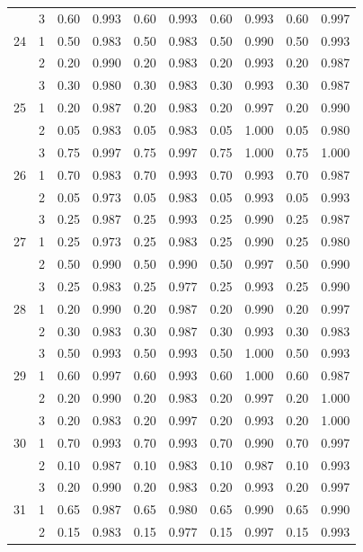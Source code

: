 \begin{longtable}{llcccccccc}
   & 3 & 0.60 & 0.993 & 0.60 & 0.993 & 0.60 & 0.993 & 0.60 & 0.997 \\ 
  24 & 1 & 0.50 & 0.983 & 0.50 & 0.983 & 0.50 & 0.990 & 0.50 & 0.993 \\ 
   & 2 & 0.20 & 0.990 & 0.20 & 0.983 & 0.20 & 0.993 & 0.20 & 0.987 \\ 
   & 3 & 0.30 & 0.980 & 0.30 & 0.983 & 0.30 & 0.993 & 0.30 & 0.987 \\ 
  25 & 1 & 0.20 & 0.987 & 0.20 & 0.983 & 0.20 & 0.997 & 0.20 & 0.990 \\ 
   & 2 & 0.05 & 0.983 & 0.05 & 0.983 & 0.05 & 1.000 & 0.05 & 0.980 \\ 
   & 3 & 0.75 & 0.997 & 0.75 & 0.997 & 0.75 & 1.000 & 0.75 & 1.000 \\ 
  26 & 1 & 0.70 & 0.983 & 0.70 & 0.993 & 0.70 & 0.993 & 0.70 & 0.987 \\ 
   & 2 & 0.05 & 0.973 & 0.05 & 0.983 & 0.05 & 0.993 & 0.05 & 0.993 \\ 
   & 3 & 0.25 & 0.987 & 0.25 & 0.993 & 0.25 & 0.990 & 0.25 & 0.987 \\ 
  27 & 1 & 0.25 & 0.973 & 0.25 & 0.983 & 0.25 & 0.990 & 0.25 & 0.980 \\ 
   & 2 & 0.50 & 0.990 & 0.50 & 0.990 & 0.50 & 0.997 & 0.50 & 0.990 \\ 
   & 3 & 0.25 & 0.983 & 0.25 & 0.977 & 0.25 & 0.993 & 0.25 & 0.990 \\ 
  28 & 1 & 0.20 & 0.990 & 0.20 & 0.987 & 0.20 & 0.990 & 0.20 & 0.997 \\ 
   & 2 & 0.30 & 0.983 & 0.30 & 0.987 & 0.30 & 0.993 & 0.30 & 0.983 \\ 
   & 3 & 0.50 & 0.993 & 0.50 & 0.993 & 0.50 & 1.000 & 0.50 & 0.993 \\ 
  29 & 1 & 0.60 & 0.997 & 0.60 & 0.993 & 0.60 & 1.000 & 0.60 & 0.987 \\ 
   & 2 & 0.20 & 0.990 & 0.20 & 0.983 & 0.20 & 0.997 & 0.20 & 1.000 \\ 
   & 3 & 0.20 & 0.983 & 0.20 & 0.997 & 0.20 & 0.993 & 0.20 & 1.000 \\ 
  30 & 1 & 0.70 & 0.993 & 0.70 & 0.993 & 0.70 & 0.990 & 0.70 & 0.997 \\ 
   & 2 & 0.10 & 0.987 & 0.10 & 0.983 & 0.10 & 0.987 & 0.10 & 0.993 \\ 
   & 3 & 0.20 & 0.990 & 0.20 & 0.983 & 0.20 & 0.993 & 0.20 & 0.997 \\ 
  31 & 1 & 0.65 & 0.987 & 0.65 & 0.980 & 0.65 & 0.990 & 0.65 & 0.990 \\ 
   & 2 & 0.15 & 0.983 & 0.15 & 0.977 & 0.15 & 0.997 & 0.15 & 0.993 \\ 

\end{longtable}
